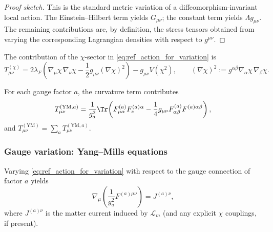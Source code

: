 \begin{proof}[Proof sketch]
This is the standard metric variation of a diffeomorphism-invariant local action.
The Einstein--Hilbert term yields $G_{\mu\nu}$; the constant term yields $\Lambda g_{\mu\nu}$.
The remaining contributions are, by definition, the stress tensors obtained from varying the corresponding Lagrangian densities with respect to $g^{\mu\nu}$.
\end{proof}

\begin{proposition}
\label{prop:info_stress_tensor}
The contribution of the $\chi$-sector in \eqref{eq:ref_action_for_variation} is
\begin{equation}
\label{eq:info_stress_tensor}
T^{(\chi)}_{\mu\nu}
=2\lambda_F\left(\nabla_\mu\chi\,\nabla_\nu\chi-\frac12 g_{\mu\nu}(\nabla\chi)^2\right)
-g_{\mu\nu}V(\chi^2),
\qquad
(\nabla\chi)^2:=g^{\alpha\beta}\nabla_\alpha\chi\,\nabla_\beta\chi.
\end{equation}
\end{proposition}

\begin{proposition}
\label{prop:ym_stress_tensor}
For each gauge factor $a$, the curvature term contributes
\begin{equation}
\label{eq:ym_stress_tensor}
T^{(\mathrm{YM},a)}_{\mu\nu}
=\frac{1}{g_a^2}\Tr\!\left(F^{(a)}_{\mu\alpha}F^{(a)}_{\nu}{}^{\alpha}-\frac14 g_{\mu\nu}F^{(a)}_{\alpha\beta}F^{(a)\alpha\beta}\right),
\end{equation}
and $T^{(\mathrm{YM})}_{\mu\nu}=\sum_a T^{(\mathrm{YM},a)}_{\mu\nu}$.
\end{proposition}

\subsubsection{Gauge variation: Yang--Mills equations}
\label{subsec:ym_equations_variation}

\begin{proposition}
\label{prop:ym_equation}
Varying \eqref{eq:ref_action_for_variation} with respect to the gauge connection of factor $a$ yields
\begin{equation}
\label{eq:ym_equation}
\nabla_\mu\left(\frac{1}{g_a^2}F^{(a)\mu\nu}\right)=J^{(a)\nu},
\end{equation}
where $J^{(a)\nu}$ is the matter current induced by $\mathcal{L}_m$ (and any explicit $\chi$ couplings, if present).
\end{proposition}


